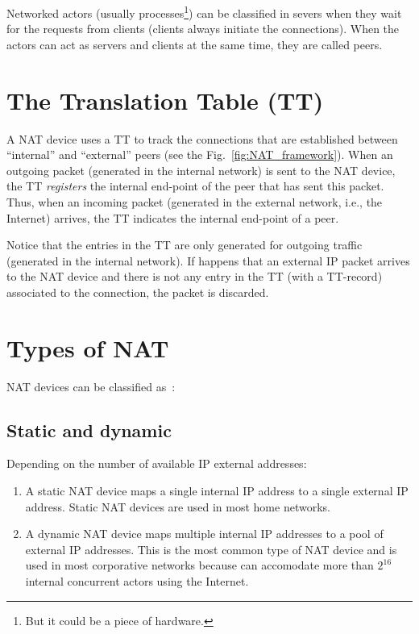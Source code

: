Networked actors (usually processes\footnote{But it could be a piece
  of hardware.}) can be classified in severs when they wait for the
requests from clients (clients always initiate the connections). When
the actors can act as servers and clients at the same time, they are
called peers.

\section{The Translation Table (TT)}

A NAT device uses a TT to track the connections that are established
between ``internal'' and ``external'' peers (see the
Fig.~\ref{fig:NAT_framework}). When an outgoing packet (generated in
the internal network) is sent to the NAT device, the TT
\emph{registers} the internal end-point of the peer that has sent this
packet. Thus, when an incoming packet (generated in the external network,
i.e., the Internet) arrives, the TT indicates the internal end-point
of a peer.

Notice that the entries in the TT are only generated for outgoing
traffic (generated in the internal network). If happens that an
external IP packet arrives to the NAT device and there is not any
entry in the TT (with a TT-record) associated to the connection, the
packet is discarded.

\section{Types of NAT}

NAT devices can be classified as~\cite{jennings2007network}:

\subsection{Static and dynamic}

Depending on the number of available IP external addresses:

\begin{enumerate}
\item A static NAT device maps a single internal IP address to a
  single external IP address. Static NAT devices are used in most home
  networks.
\item A dynamic NAT device maps multiple internal IP addresses to a
  pool of external IP addresses. This is the most common type of NAT
  device and is used in most corporative networks because can
  accomodate more than $2^{16}$ internal concurrent actors using
  the Internet.
\end{enumerate}

